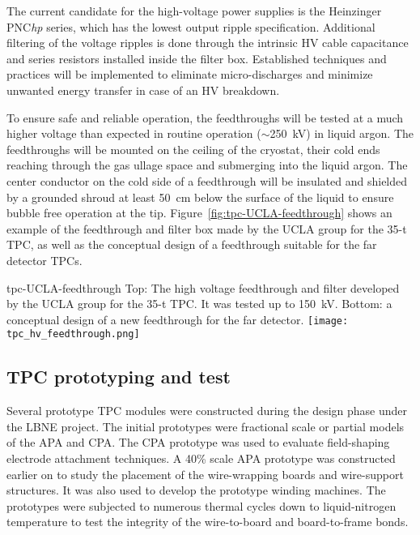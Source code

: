 The current candidate for the high-voltage power supplies is the
Heinzinger PNC{\it hp} series, which has the lowest output ripple
specification.  Additional filtering of the voltage ripples is done
through the intrinsic HV cable capacitance and series resistors
installed inside the filter box. Established techniques and practices
will be implemented to eliminate micro-discharges and minimize
unwanted energy transfer in case of an HV breakdown.
  
To ensure safe and reliable operation, the feedthroughs will be tested
at a much higher voltage than expected in routine operation
($\sim$250~kV) in liquid argon. The feedthroughs will be mounted on
the ceiling of the cryostat, their cold ends reaching through the gas
ullage space and submerging into the liquid argon. The center
conductor on the cold side of a feedthrough will be insulated and
shielded by a grounded shroud at least 50~cm below the surface of the
liquid to ensure bubble free operation at the
tip. Figure~\ref{fig:tpc-UCLA-feedthrough} shows an example of the
feedthrough and filter box made by the UCLA group for the 35-t TPC,
as well as the conceptual design of a feedthrough suitable for the far
detector TPCs.
\begin{cdrfigure}{tpc-UCLA-feedthrough}
{Top: The high voltage feedthrough and filter developed by the UCLA 
group for the 35-t TPC.  It was tested up to 150~kV.  
Bottom: a conceptual design of a new feedthrough for the far detector.}
\texttt{[image: tpc\_hv\_feedthrough.png]}
\end{cdrfigure}


\subsection{TPC prototyping and test}
\label{subsec:fd-ref-tpc-proto}


Several prototype TPC modules were constructed during the design phase
under the LBNE project. The initial prototypes were fractional scale
or partial models of the APA and CPA. The CPA prototype was used to
evaluate field-shaping electrode attachment techniques. A 40\% scale
APA prototype was constructed earlier on to study the placement of the
wire-wrapping boards and wire-support structures. It was also used to
develop the prototype winding machines. The prototypes were subjected
to numerous thermal cycles down to liquid-nitrogen temperature to test
the integrity of the wire-to-board and board-to-frame bonds.

